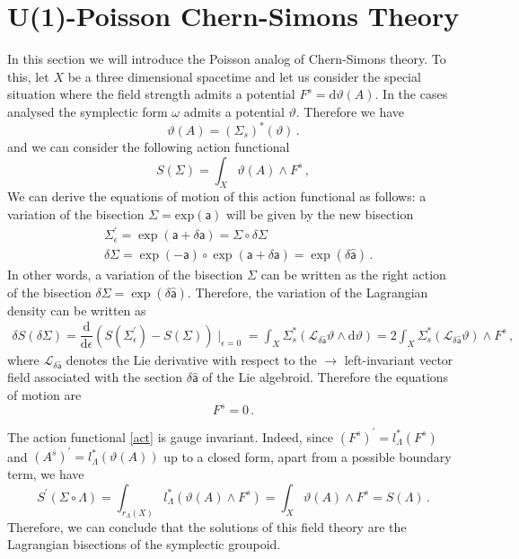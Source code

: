 \documentclass[12pt,a4paper]{article}
\numberwithin{equation}{section}
\theoremstyle{definition}
\newcommand{\dd}{\mathrm{d}}
\newcommand{\sfa}{\mathsf{a}}
\newcommand{\be}{\begin{equation}}
\newcommand{\ee}{\end{equation}}
\newcommand{\eqn}{\eqref}
\begin{document}
{\section{U(1)-Poisson Chern-Simons Theory}\label{CSmod}

In this section we will introduce the Poisson analog of Chern-Simons theory. To this, let $X$ be a three dimensional spacetime and let us consider the special situation where the field strength admits a potential $F^s = \dd \vartheta(A)$. In the cases analysed the symplectic form $\omega$ admits a potential $\vartheta$. Therefore we have
\be
\vartheta(A) = \left(\Sigma_s\right)^*(\vartheta)\,.
\ee
and we can consider the following action functional
\be\label{act}
S(\Sigma) = \int_X \vartheta(A)\wedge F^s\,,
\ee
We can derive the equations of motion of this action functional as follows: a variation of the bisection $\Sigma = \mathrm{exp}(\sfa)$ will be given by the new bisection 
\be
\begin{split}
&\Sigma_{\epsilon}^{\prime} = \exp(\sfa+\delta \sfa)=\Sigma\circ\delta\Sigma \\
&\delta\Sigma =\exp(-\sfa) \circ \exp(\sfa+\delta \sfa) = \exp(\delta \widehat{\sfa})\,.
\end{split}
\ee
In other words, a variation of the bisection $\Sigma$ can be written as the right action of the bisection $\delta\Sigma = \exp(\delta \widehat{\sfa})$. Therefore, the variation of the Lagrangian density can be written as 
\be
\begin{split}
\delta S (\delta \Sigma) = \dfrac{\dd}{\dd \epsilon}\left( S(\Sigma_{\epsilon}^{\prime}) - S(\Sigma) \right)\mid_{\epsilon=0}= \int_{X}\Sigma_s^*(\mathcal{L}_{\delta \widehat{\sfa}} \vartheta\wedge \dd \vartheta) = 2\int_{X}\Sigma_s^*(\mathcal{L}_{\delta \widehat{\sfa}}\vartheta)\wedge F^s\,,
\end{split}
\ee
where $\mathcal{L}_{\delta \widehat{\sfa}}$ denotes the Lie derivative with respect to the  $\rightarrow$ left-invariant vector field associated with the section $\delta \widehat{\sfa}$ of the Lie algebroid. Therefore the equations of motion are
\be 
F^s =0\,.
\ee

The action functional \eqn{act} is gauge invariant. Indeed, since $(F^s)^{\prime}=l_{\Lambda}^*(F^s)$ and $(A^s)^{\prime}= l_{\Lambda}^*(\vartheta( A))$ up to a closed form, apart from a possible boundary term, we have 
\be
S^{\prime}(\Sigma\circ \Lambda) = \int_{r_{\Lambda}(X)}l_{\Lambda}^*(\vartheta(A)\wedge F^s) = \int_X \vartheta (A)\wedge F^s = S(\Lambda)\,.
\ee
Therefore, we can conclude that the solutions of this field theory are the Lagrangian bisections of the symplectic groupoid. 

}
\end{document}
